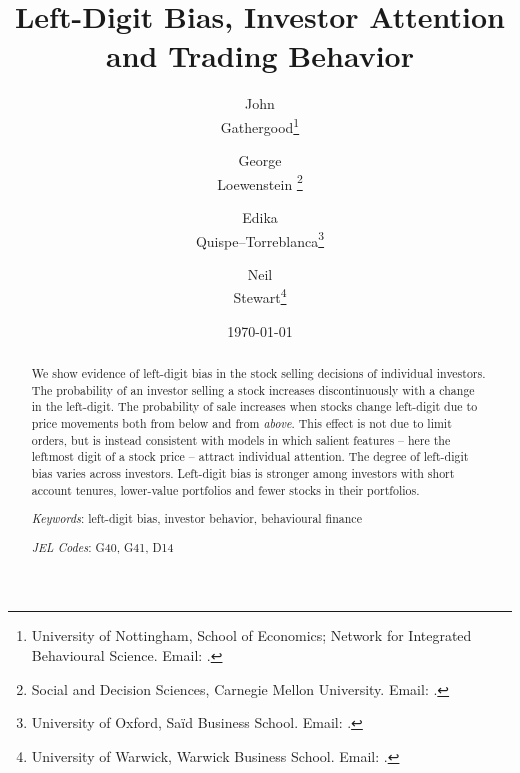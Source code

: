 
\title{\textbf{\Large{Left-Digit Bias, Investor Attention and Trading Behavior}}}

\singlespacing

\author{%
   John \\ Gathergood\thanks{University of Nottingham, School of Economics; Network for Integrated Behavioural Science. Email: .}%
   \and%
   George \\ Loewenstein%
   \thanks{Social and Decision Sciences, Carnegie Mellon University. Email: .}%
   \and%
   Edika \\ Quispe--Torreblanca\thanks{University of Oxford, Sa\"{i}d Business School. Email: .}%
    \and%
   Neil \\ Stewart\thanks{University of Warwick, Warwick Business School. Email: .}%
}

\date{%
	\vspace{1cm}\large%
	\today%
	\normalsize\\[1cm]%
}

\maketitle

\onehalfspacing

\begin{abstract}
   \noindent We show evidence of left-digit bias in the stock selling decisions of individual investors. The probability of an investor selling a stock increases discontinuously with a change in the left-digit. The probability of sale increases when stocks change left-digit due to price movements both from below and from \textit{above}. This effect is not due to limit orders, but is instead consistent with models in which salient features -- here the leftmost digit of a stock price -- attract individual attention. The degree of left-digit bias varies across investors. Left-digit bias is stronger among investors with short account tenures, lower-value portfolios and fewer stocks in their portfolios. 
   
   \vspace{2ex}\noindent%
   \textit{Keywords}: left-digit bias, investor behavior, behavioural finance

   \vspace{.5ex}\noindent%
   \textit{JEL Codes}: G40, G41, D14
\end{abstract}

\doublespacing
